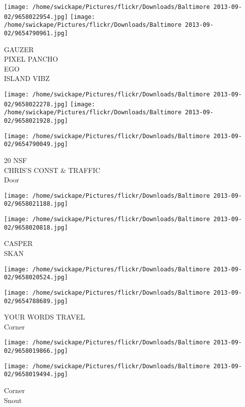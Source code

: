\documentclass[10pt,letterpaper]{article}
\begin{document}
\texttt{[image: /home/swickape/Pictures/flickr/Downloads/Baltimore 2013-09-02/9658022954.jpg]}
\texttt{[image: /home/swickape/Pictures/flickr/Downloads/Baltimore 2013-09-02/9654790961.jpg]}

GAUZER\\
PIXEL PANCHO\\
EGO\\
ISLAND VIBZ\\
\pagebreak

\texttt{[image: /home/swickape/Pictures/flickr/Downloads/Baltimore 2013-09-02/9658022278.jpg]}
\texttt{[image: /home/swickape/Pictures/flickr/Downloads/Baltimore 2013-09-02/9658021928.jpg]}

\texttt{[image: /home/swickape/Pictures/flickr/Downloads/Baltimore 2013-09-02/9654790049.jpg]}

20 NSF\\
CHRIS'S CONST \& TRAFFIC\\
Door\\
\pagebreak

\texttt{[image: /home/swickape/Pictures/flickr/Downloads/Baltimore 2013-09-02/9658021188.jpg]}

\vspace{0.25in}
\texttt{[image: /home/swickape/Pictures/flickr/Downloads/Baltimore 2013-09-02/9658020818.jpg]}

CASPER\\
SKAN\\
\pagebreak

\texttt{[image: /home/swickape/Pictures/flickr/Downloads/Baltimore 2013-09-02/9658020524.jpg]}

\vspace{0.25in}
\texttt{[image: /home/swickape/Pictures/flickr/Downloads/Baltimore 2013-09-02/9654788689.jpg]}

YOUR WORDS TRAVEL\\
Corner\\
\pagebreak

\texttt{[image: /home/swickape/Pictures/flickr/Downloads/Baltimore 2013-09-02/9658019866.jpg]}

\vspace{0.25in}
\texttt{[image: /home/swickape/Pictures/flickr/Downloads/Baltimore 2013-09-02/9658019494.jpg]}

Corner\\
Snout\\
\pagebreak
\end{document}
